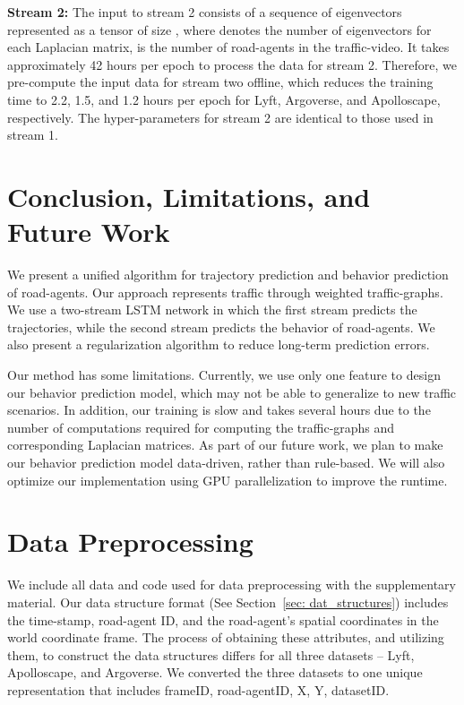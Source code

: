 \documentclass[10pt,twocolumn,letterpaper]{article}
\theoremstyle{plain}
\begin{document}
\textbf{Stream 2: }The input to stream 2 consists of a sequence of eigenvectors represented as a tensor of size , where  denotes the number of eigenvectors for each Laplacian matrix,  is the number of road-agents in the traffic-video. It takes approximately 42 hours per epoch to process the data for stream 2. Therefore, we pre-compute the input data for stream two offline, which reduces the training time to 2.2, 1.5, and 1.2 hours per epoch for Lyft, Argoverse, and Apolloscape, respectively. The hyper-parameters for stream 2 are identical to those used in stream 1.
\vspace{-5pt}
 \section{Conclusion, Limitations, and Future Work}

We present a unified algorithm for trajectory prediction and behavior prediction of road-agents. Our approach represents traffic through weighted traffic-graphs. We use a two-stream LSTM network in which the first stream predicts the trajectories, while the second stream predicts the behavior of road-agents. We also present a regularization algorithm to reduce long-term prediction errors.

Our method has some limitations. Currently, we use only one feature to design our behavior prediction model, which may not be able to generalize to new traffic scenarios. In addition, our training is slow and takes several hours due to the number of computations required for computing the traffic-graphs and corresponding Laplacian matrices. As part of our future work, we plan to make our behavior prediction model data-driven, rather than rule-based. We will also optimize our implementation using GPU parallelization to improve the runtime. 



{\small


}
\clearpage
\section{Data Preprocessing}
\label{sec: AppendixA}
We include all data and code used for data preprocessing with the supplementary material. Our data structure format (See Section~\ref{sec: dat_structures}) includes the time-stamp, road-agent ID, and the road-agent's spatial coordinates in the world coordinate frame. The process of obtaining these attributes, and utilizing them, to construct the data structures differs for all three datasets -- Lyft, Apolloscape, and Argoverse. We converted the three datasets to one unique representation that includes frameID, road-agentID, X, Y, datasetID. 
\end{document}
